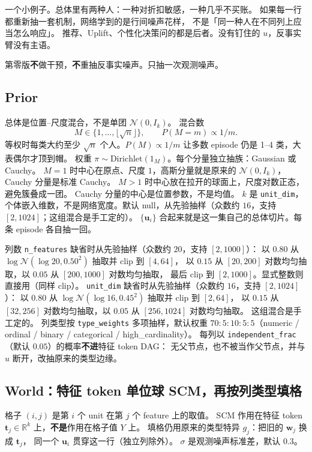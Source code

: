 \documentclass[11pt,a4paper,fontset=none]{ctexart}
\newcommand{\uu}{\mathbf{u}}
\begin{document}
一个小例子。总体里有两种人：一种对折扣敏感，一种几乎不买账。
如果每一行都重新抽一套机制，网络学到的是行间噪声花样，
不是「同一种人在不同列上应当怎么响应」。
推荐、Uplift、个性化决策问的都是后者。没有钉住的 $u$，反事实臂没有主语。

第零版\textbf{不}做干预，\textbf{不}重抽反事实噪声。只抽一次观测噪声。

\subsection{Prior}

总体是位置--尺度混合，不是单团 $\mathcal{N}(0,I_k)$。
混合数
\begin{equation}
  M \in \{1,\ldots,\lfloor\sqrt{n}\rfloor\},\qquad
  P(M=m) \propto 1/m.
\end{equation}
等权时每类大约至少 $\sqrt{n}$ 个人。$P(M)\propto 1/m$ 让多数 episode 仍是 1--4 类，大表偶尔才顶到帽。
权重 $\pi\sim\mathrm{Dirichlet}(1_M)$。每个分量独立抽族：Gaussian 或 Cauchy。
$M=1$ 时中心在原点、尺度 $1$，高斯分量就是原来的 $\mathcal{N}(0,I_k)$，Cauchy 分量是标准 Cauchy。
$M>1$ 时中心放在拉开的球面上，尺度对数正态，避免簇叠成一团。
Cauchy 分量的中心是位置参数，不是均值。
$k$ 是 \texttt{unit\_dim}，个体嵌入维数，不是网络宽度。默认 null，从先验抽样（众数约 $16$，支持 $[2,1024]$；这组混合是手工定的）。
$\{\uu_i\}$ 合起来就是这一集自己的总体切片。每条 episode 各自抽一回。

列数 \texttt{n\_features} 缺省时从先验抽样（众数约 $20$，支持 $[2,1000]$）：
以 $0.80$ 从 $\log\mathcal{N}(\log 20, 0.50^2)$ 抽取并 clip 到 $[4,64]$，
以 $0.15$ 从 $[20,200]$ 对数均匀抽取，以 $0.05$ 从 $[200,1000]$ 对数均匀抽取，
最后 clip 到 $[2,1000]$。显式整数则直接用（同样 clip）。
\texttt{unit\_dim} 缺省时从先验抽样（众数约 $16$，支持 $[2,1024]$）：
以 $0.80$ 从 $\log\mathcal{N}(\log 16, 0.45^2)$ 抽取并 clip 到 $[2,64]$，
以 $0.15$ 从 $[32,256]$ 对数均匀抽取，以 $0.05$ 从 $[256,1024]$ 对数均匀抽取。
这组混合是手工定的。
列类型按 \texttt{type\_weights} 多项抽样，默认权重
$70{:}5{:}10{:}5{:}5$（numeric / ordinal / binary / categorical / high\_cardinality）。
每列以 \texttt{independent\_frac}（默认 $0.05$）的概率\textbf{不进}特征 token DAG：
无父节点，也不被当作父节点，并与 $u$ 断开，改抽原来的类型边缘。

\subsection{World：特征 token 单位球 SCM，再按列类型填格}

格子 $(i,j)$ 是第 $i$ 个 unit 在第 $j$ 个 feature 上的取值。
SCM 作用在特征 token $\mathbf{t}_j\in\mathbb{R}^k$ 上，\textbf{不是}作用在格子值 $Y$ 上。
填格仍用原来的类型特异 $g_j$：把旧的 $\mathbf{w}_j$ 换成 $\mathbf{t}_j$，
同一个 $\uu_i$ 贯穿这一行（独立列除外）。
$\sigma$ 是观测噪声标准差，默认 $0.3$。
\end{document}
